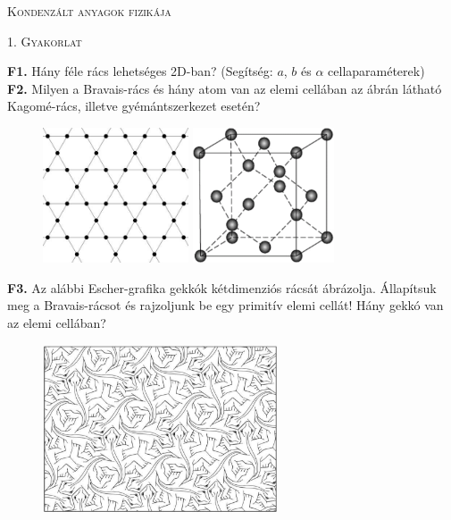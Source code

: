 \documentclass[12pt]{article}
\begin{document}
\centerline{
\textsc{\Large{ Kondenzált anyagok fizikája}}
}
\centerline{ 
\textsc{\large{1. Gyakorlat}}
}
\vspace{10mm}
\textbf{F1.} Hány féle rács lehetséges 2D-ban? (Segítség: $a$, $b$ és $\alpha$  cellaparaméterek)
\\

\textbf{F2.} Milyen a Bravais-rács és hány atom van az elemi cellában az ábrán látható Kagomé-rács, illetve gyémántszerkezet esetén?

\begin{figure}[h!]

\begin{center}


\includegraphics[height=4cm]{../images/KagomeLattice.jpg} \hspace{10mm}
\includegraphics[height=4cm]{../images/gyemant.png}
\end{center}
\end{figure}

\textbf{F3.} Az alábbi Escher-grafika gekkók kétdimenziós rácsát ábrázolja. Állapítsuk meg a Bravais-rácsot és rajzoljunk be egy primitív elemi cellát! Hány gekkó van az elemi cellában?
\begin{figure}[h!]
\begin{center}
\includegraphics[height=5cm]{../images/1-Escher.png}
\end{center}
\end{figure}
\end{document}
